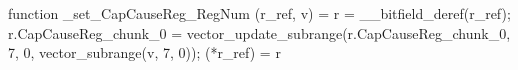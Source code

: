 function _set_CapCauseReg_RegNum (r_ref, v) = {
    r = __bitfield_deref(r_ref);
    r.CapCauseReg_chunk_0 = vector_update_subrange(r.CapCauseReg_chunk_0, 7, 0, vector_subrange(v, 7, 0));
    (*r_ref) = r
}
